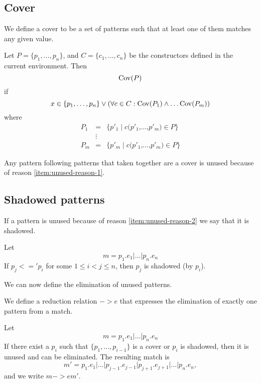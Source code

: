 \subsection{Cover}\label{sec:cover}
We define a cover to be a set of patterns such that at least one of them matches
any given value.

\begin{definition}[Cover]\label{def:cover}
  Let $P = \{p_1, \ldots, p_n \}$, and $C = \{c_1, \ldots, c_n\}$ be the constructors
  defined in the current environment. Then
  \[
  \mathrm{Cov}(P)
  \]
  if
  \[
  x \in \{p_1, \ldots, p_n \} \lor (\forall c \in C : \mathrm{Cov}(P_1) \land
  \ldots \mathrm{Cov}(P_m))
  \]
  where
  \begin{eqnarray*}
    P_1 &=& \{p'_1 \mid c \texttt{(} p'_1 \texttt{,} \ldots \texttt{,} p'_m \texttt{)} \in P\}\\
    &\vdots&\\
    P_m &=& \{p'_m \mid c \texttt{(} p'_1 \texttt{,} \ldots \texttt{,} p'_m \texttt{)} \in P\}
  \end{eqnarray*}
\end{definition}

Any pattern following patterns that taken together are a cover is unused because
of reason \ref{item:unused-reason-1}.

\subsection{Shadowed patterns}\label{sec:shadowed-patterns}
If a pattern is unused because of reason \ref{item:unused-reason-2} we say that
it is shadowed.
\begin{definition}[Shadowed]
  Let
  \[
  m = p_1\texttt{.}e_1 \texttt{|} \ldots \texttt{|} p_n\texttt{.}e_n
  \]
  If $p_j <=' p_i$ for some $1 \leq i < j \leq n$, then $p_j$ is shadowed (by
  $p_i$).
\end{definition}

We can now define the elimination of unused patterns.
\begin{definition}[Elimination, $->e$]
\label{def:shadowed-patterns-1}
  We define a reduction relation $->e$ that expresses the
  elimination of exactly one pattern from a match.

  Let
  \[
  m = p_1\texttt{.}e_1 \texttt{|} \ldots \texttt{|} p_n\texttt{.}e_n
  \]
  If there exist a $p_i$ such that $\{p_1, \ldots, p_{i-1}\}$ is a cover or
  $p_i$ is shadowed, then it is unused and can be eliminated. The resulting
  match is
  \[
  m' = p_1\texttt{.}e_1 \texttt{|} \ldots \texttt{|}
  p_{j-1}\texttt{.}e_{j-1} \texttt{|} p_{j+1}\texttt{.}e_{j+1} \texttt{|}
  \ldots \texttt{|} p_n\texttt{.}e_n,
  \]
  and we write $m ->e m'$.

\end{definition}

